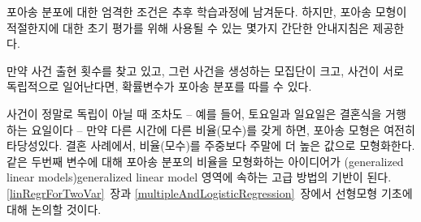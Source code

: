 포아송 분포에 대한 엄격한 조건은 추후 학습과정에 남겨둔다. 하지만, 포아송 모형이 적절한지에 대한 초기 평가를 위해 사용될 수 있는 몇가지 간단한 안내지침은 제공한다.

\begin{tipBox}{
만약 사건 출현 횟수를 찾고 있고, 그런 사건을 생성하는 모집단이 크고, 사건이 서로 독립적으로 일어난다면, 확률변수가 포아송 분포를 따를 수 있다.}
\end{tipBox}

사건이 정말로 독립이 아닐 때 조차도 -- 예를 들어, 토요일과 일요일은 결혼식을 거행하는 요일이다 -- 만약 다른 시간에 다른 비율(모수)를 갖게 하면, 포아송 모형은 여전히 타당성있다. 결혼 사례에서, 비율(모수)를 주중보다 주말에 더 높은 값으로 모형화한다. 같은 두번째 변수에 대해 포아송 분포의 비율을 모형화하는 아이디어가 (generalized linear models){generalized linear model} 영역에 속하는 고급 방법의 기반이 된다. \ref{linRegrForTwoVar}~장과 \ref{multipleAndLogisticRegression}~장에서 선형모형 기초에 대해 논의할 것이다.



